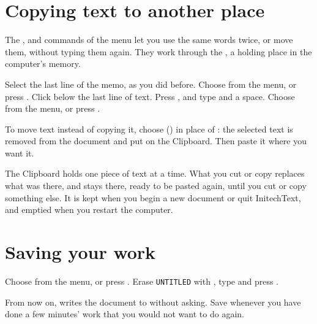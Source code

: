 \section{Copying text to another place}
The ,  and  commands of the
 menu let you use the same words twice, or move them, without
typing them again.  They work through the , a holding place
in the computer's memory.
\begin{TaskSteps}
\Step Select the last line of the memo, as you did before.
\Step Choose  from the  menu, or press
.
\Step Click below the last line of text.
\Step Press , and type  and a
space.
\Step Choose  from the  menu, or press
.
\end{TaskSteps}


To move text instead of copying it, choose  ()
in place of : the selected text is removed from the document
and put on the Clipboard.  Then paste it where you want it.

The Clipboard holds one piece of text at a time.  What you cut or copy
replaces what was there, and stays there, ready to be pasted again, until
you cut or copy something else.  It is kept when you begin a new document
or quit InitechText, and emptied when you restart the computer.

\section{Saving your work}
\begin{TaskSteps}
\Step Choose  from the  menu, or press
.
\Step Erase \texttt{UNTITLED} with , type 
and press .
\end{TaskSteps}
From now on,  writes the document to 
without asking.  Save whenever you have done a few minutes' work that you
would not want to do again.

